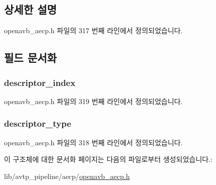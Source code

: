 \subsection{상세한 설명}


openavb\+\_\+aecp.\+h 파일의 317 번째 라인에서 정의되었습니다.



\subsection{필드 문서화}
\subsubsection[{\texorpdfstring{descriptor\+\_\+index}{descriptor_index}}]{ descriptor\+\_\+index}\hypertarget{structopenavb__aecp__commandresponse__data__start__streaming__t_ab26fb363c24b9a2a4391f9171c981b08}{}\label{structopenavb__aecp__commandresponse__data__start__streaming__t_ab26fb363c24b9a2a4391f9171c981b08}


openavb\+\_\+aecp.\+h 파일의 319 번째 라인에서 정의되었습니다.

\subsubsection[{\texorpdfstring{descriptor\+\_\+type}{descriptor_type}}]{ descriptor\+\_\+type}\hypertarget{structopenavb__aecp__commandresponse__data__start__streaming__t_a1e231d7874aada5925b29affc76782cc}{}\label{structopenavb__aecp__commandresponse__data__start__streaming__t_a1e231d7874aada5925b29affc76782cc}


openavb\+\_\+aecp.\+h 파일의 318 번째 라인에서 정의되었습니다.



이 구조체에 대한 문서화 페이지는 다음의 파일로부터 생성되었습니다.\+:\begin{DoxyCompactItemize}
\item 
lib/avtp\+\_\+pipeline/aecp/\hyperlink{openavb__aecp_8h}{openavb\+\_\+aecp.\+h}\end{DoxyCompactItemize}
